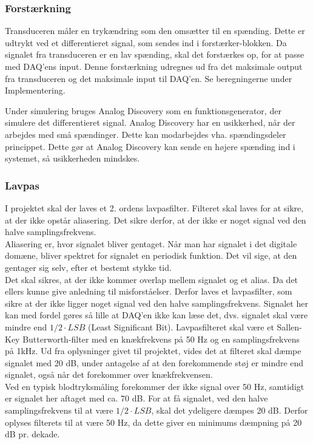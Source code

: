 \subsubsection{Forstærkning}
Transduceren måler en trykændring som den omsætter til en spænding. Dette er udtrykt ved et differentieret signal, som sendes ind i forstærker-blokken. Da signalet fra transduceren er en lav spænding, skal det forstærkes op, for at passe med DAQ'ens input. Denne forstærkning udregnes ud fra det maksimale output fra transduceren og det maksimale input til DAQ'en. Se beregningerne under Implementering.  

Under simulering bruges Analog Discovery som en funktionsgenerator, der simulere det differentieret signal. Analog Discovery har en usikkerhed, når der arbejdes med små spændinger. Dette kan modarbejdes vha. spændingsdeler princippet. Dette gør at Analog Discovery kan sende en højere spænding ind i systemet, så usikkerheden mindskes.  

\subsubsection{Lavpas}
I projektet skal der laves et 2. ordens lavpasfilter. Filteret skal laves for at sikre, at der ikke opstår aliasering. Det sikre derfor, at der ikke er noget signal ved den halve samplingsfrekvens.\\
Aliasering \cite{DSB} er, hvor signalet bliver gentaget. Når man har signalet i det digitale domæne, bliver spektret for signalet en periodisk funktion. Det vil sige, at den gentager sig selv, efter et bestemt stykke tid. \\
Det skal sikres, at der ikke kommer overlap mellem signalet og et alias. Da det ellers kunne give anledning til misforståelser. Derfor laves et lavpasfilter, som sikre at der ikke ligger noget signal ved den halve samplingsfrekvens. Signalet her kan med fordel gøres så lille at DAQ'en ikke kan læse det, dvs. signalet skal være mindre end $ 1/2 \cdot LSB $ (Least Significant Bit).    
\newline  
Lavpasfilteret skal være et Sallen-Key Butterworth-filter med en knækfrekvens på 50 Hz og en samplingsfrekvens på 1kHz. Ud fra oplysninger givet til projektet, vides det at filteret skal dæmpe signalet med 20 dB, under antagelse af at den forekommende støj er mindre end signalet, også når det  forekommer over knækfrekvensen.\\
Ved en typisk blodtryksmåling forekommer der ikke signal over 50 Hz, samtidigt er signalet her aftaget med ca. 70 dB. For at få signalet, ved den halve samplingsfrekvens til at være $ 1/2 \cdot LSB $, skal det ydeligere dæmpes 20 dB. Derfor oplyses filterets til at være 50 Hz, da dette giver en minimums dæmpning på 20 dB pr. dekade.

